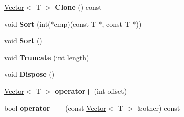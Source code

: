 \begin{DoxyCompactItemize}
\item 
\hypertarget{classv8_1_1internal_1_1_vector_add01b651ef9015bdbe8f3b3228f07bc8}{}\hyperlink{classv8_1_1internal_1_1_vector}{Vector}$<$ T $>$ {\bfseries Clone} () const \label{classv8_1_1internal_1_1_vector_add01b651ef9015bdbe8f3b3228f07bc8}

\item 
\hypertarget{classv8_1_1internal_1_1_vector_a0efe2f76271d5f9cb752bb332795ddf1}{}void {\bfseries Sort} (int($\ast$cmp)(const T $\ast$, const T $\ast$))\label{classv8_1_1internal_1_1_vector_a0efe2f76271d5f9cb752bb332795ddf1}

\item 
\hypertarget{classv8_1_1internal_1_1_vector_a1914139a503a171e777f3d0b951069aa}{}void {\bfseries Sort} ()\label{classv8_1_1internal_1_1_vector_a1914139a503a171e777f3d0b951069aa}

\item 
\hypertarget{classv8_1_1internal_1_1_vector_abe3333b756820ec1f98474bed844f096}{}void {\bfseries Truncate} (int length)\label{classv8_1_1internal_1_1_vector_abe3333b756820ec1f98474bed844f096}

\item 
\hypertarget{classv8_1_1internal_1_1_vector_a29bc665bb5c8a27e328107fcd414eef2}{}void {\bfseries Dispose} ()\label{classv8_1_1internal_1_1_vector_a29bc665bb5c8a27e328107fcd414eef2}

\item 
\hypertarget{classv8_1_1internal_1_1_vector_a3e1a53b737875e85f8c0d0745be3ce31}{}\hyperlink{classv8_1_1internal_1_1_vector}{Vector}$<$ T $>$ {\bfseries operator+} (int offset)\label{classv8_1_1internal_1_1_vector_a3e1a53b737875e85f8c0d0745be3ce31}

\item 
\hypertarget{classv8_1_1internal_1_1_vector_a37fa50b75d0affc934489e33b37d9ede}{}bool {\bfseries operator==} (const \hyperlink{classv8_1_1internal_1_1_vector}{Vector}$<$ T $>$ \&other) const \label{classv8_1_1internal_1_1_vector_a37fa50b75d0affc934489e33b37d9ede}

\end{DoxyCompactItemize}
